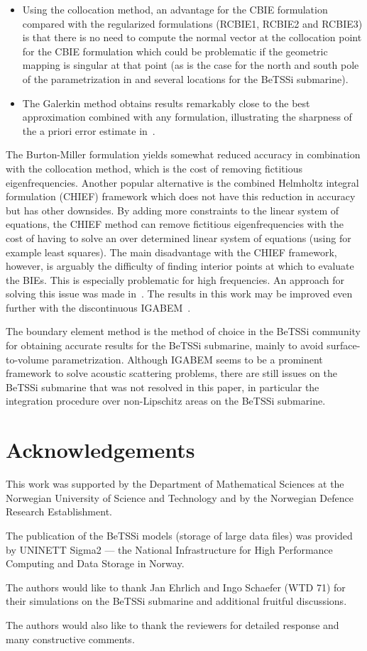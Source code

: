 \begin{itemize}
	\item Using the collocation method, an advantage for the CBIE formulation compared with the regularized formulations (RCBIE1, RCBIE2 and RCBIE3) is that there is no need to compute the normal vector at the collocation point for the CBIE formulation which could be problematic if the geometric mapping is singular at that point (as is the case for the north and south pole of the parametrization in  and several locations for the BeTSSi submarine).
	\item The Galerkin method obtains results remarkably close to the best approximation combined with any formulation, illustrating the sharpness of the a priori error estimate in~.
\end{itemize}
The Burton-Miller formulation yields somewhat reduced accuracy in combination with the collocation method, which is the cost of removing fictitious eigenfrequencies. Another popular alternative is the combined Helmholtz integral formulation (CHIEF) framework which does not have this reduction in accuracy but has other downsides. By adding more constraints to the linear system of equations, the CHIEF method can remove fictitious eigenfrequencies with the cost of having to solve an over determined linear system of equations (using for example least squares). The main disadvantage with the CHIEF framework, however, is arguably the difficulty of finding interior points at which to evaluate the BIEs. This is especially problematic for high frequencies. An approach for solving this issue was made in~\cite{Wu1991awr}. The results in this work may be improved even further with the discontinuous IGABEM~\cite{Sun2019dib}.

The boundary element method is the method of choice in the BeTSSi community for obtaining accurate results for the BeTSSi submarine, mainly to avoid surface-to-volume parametrization. Although IGABEM seems to be a prominent framework to solve acoustic scattering problems, there are still issues on the BeTSSi submarine that was not resolved in this paper, in particular the integration procedure over non-Lipschitz areas on the BeTSSi submarine.

\section*{Acknowledgements}
This work was supported by the Department of Mathematical Sciences at the Norwegian University of Science and Technology and by the Norwegian Defence Research Establishment.

The publication of the BeTSSi models (storage of large data files) was provided by UNINETT Sigma2 --- the National Infrastructure for High Performance Computing and Data Storage in Norway.

The authors would like to thank Jan Ehrlich and Ingo Schaefer (WTD 71) for their simulations on the BeTSSi submarine and additional fruitful discussions.

The authors would also like to thank the reviewers for detailed response and many constructive comments.
